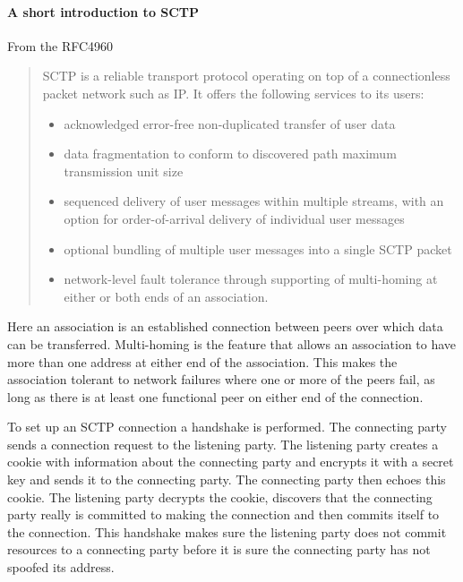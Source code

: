 \paragraph{A short introduction to SCTP}
From the RFC4960\cite{_rfc_????}
\begin{quotation}
SCTP is a reliable transport protocol operating on top of a
   connectionless packet network such as IP.  It offers the following
   services to its users:
\begin{itemize}

   \item acknowledged error-free non-duplicated transfer of user data

   \item data fragmentation to conform to discovered path maximum transmission unit size

   \item sequenced delivery of user messages within multiple streams, with
       an option for order-of-arrival delivery of individual user
       messages

   \item optional bundling of multiple user messages into a single SCTP
       packet

   \item network-level fault tolerance through supporting of multi-homing
       at either or both ends of an association.
\end{itemize}
\end{quotation}
Here an association is an established connection between peers over which data can be transferred. Multi-homing is the feature that allows an association to have more than one address at either end of the association. This makes the association tolerant to network failures where one or more of the peers fail, as long as there is at least one functional peer on either end of the connection.

To set up an SCTP connection a handshake is performed. The connecting party sends a connection request to the listening party. The listening party creates a cookie with information about the connecting party and encrypts it with a secret key and sends it to the connecting party. The connecting party then echoes this cookie. The listening party decrypts the cookie, discovers that the connecting party really is committed to making the connection and then commits itself to the connection. This handshake makes sure the listening party does not commit resources to a connecting party before it is sure the connecting party has not spoofed its address.

